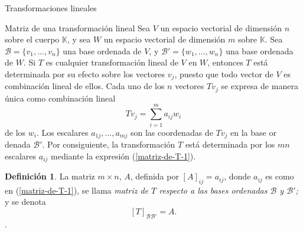 \documentclass[a4paper,12pt,twoside,spanish]{amsbook}
\theoremstyle{definition}
\newtheorem{definicion}{Definici\'on}[section]
\theoremstyle{remark}
\newcommand{\K}{\mathbb K}
\begin{document}
\begin{chapter}{Transformaciones lineales}
		\begin{section}{Matriz de una transformación lineal}
			Sea $V$ un espacio vectorial de dimensión $n$ sobre el cuerpo $\K$, y sea $W$ un espacio vectorial de dimensión $m$ sobre $\K$. Sea $\mathcal B = \{v_1,\ldots,v_n\}$ una base ordenada de $V$, y $\mathcal B' = \{w_1,\ldots,w_n\}$ una base ordenada de $W$. Si $T$ es cualquier 		transformación lineal de $V$ en $W$, entonces $T$ está determinada por su efecto sobre los vectores $v_j$, puesto que todo vector de $V$ es combinación lineal de ellos. Cada uno de los $n$ vectores $Tv_j$ se expresa de manera única 	como combinación lineal
			\begin{equation}\label{matriz-de-T-1}
				Tv_j = \sum_{i=1}^{m} a_{ij} w_i
			\end{equation}
			de los $w_i$. Los escalares $a_{1j},\ldots,a_{mj}$ son las coordenadas de $Tv_j$ en la base or	denada $\mathcal B'$. Por consiguiente, la transformación $T$ está determinada por los
			$mn$ escalares $a_{ij}$ mediante la expresión (\ref{matriz-de-T-1}). 
			
			\begin{definicion}
				La matriz $m \times n$, $A$, definida por $[A]_{ij} = a_{ij}$, donde $a_{ij}$  es como en  (\ref{matriz-de-T-1}), se llama \textit{matriz de $T$ respecto a las bases ordenadas $\mathcal B$ y $\mathcal B'$;} y se denota 
				$$
				[T]_{\mathcal B \mathcal B'} = A .
				$$.
			\end{definicion}
			

\end{section}
\end{chapter}
\end{document}
